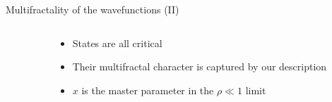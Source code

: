 \documentclass[xcolor=x11names,compress,professionalfonts]{beamer}
\renewcommand{\(}{\begin{columns}}
\renewcommand{\)}{\end{columns}}
\newcommand{\<}[1]{\begin{column}{#1}}
\renewcommand{\>}{\end{column}}
\begin{document}
\begin{frame}{Multifractality of the wavefunctions (II)}
\begin{columns}
	\begin{column}{5cm}
		\centering
	\end{column}
	\begin{column}{5cm}
		\begin{itemize}
			\item States are all critical
			\item Their multifractal character is captured by our description
			\item $x$ is the master parameter in the $\rho \ll 1$ limit
		\end{itemize}
	\end{column}
\end{columns}
\end{frame}
\end{document}
